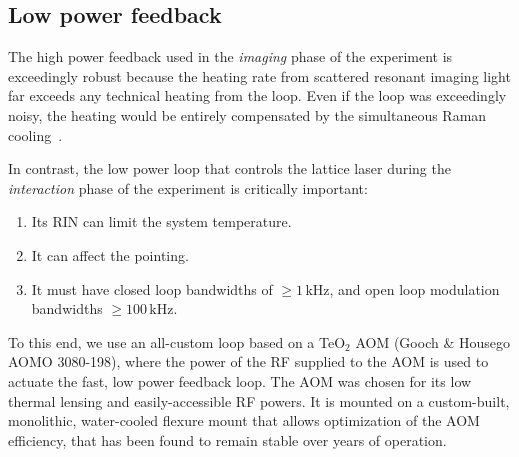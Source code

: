 \documentclass[twocolumn,aps,pra,showpacs,preprintnumbers,bibnotes]{revtex4-1}
\begin{document}
\subsection{Low power feedback}
The high power feedback used in the \textit{imaging} phase of the experiment is exceedingly robust because the heating rate from scattered resonant imaging light far exceeds any technical heating from the loop.
Even if the loop was exceedingly noisy, the heating would be entirely compensated by the simultaneous Raman cooling~\cite{Parsons2015}.

In contrast, the low power loop that controls the lattice laser during the \textit{interaction} phase of the experiment is critically important:
\begin{enumerate}
  \item Its RIN can limit the system temperature.
  \item It can affect the pointing.
  \item It must have closed loop bandwidths of $\geq1\mathrm{\,kHz}$, and open loop modulation bandwidths $\geq 100\mathrm{\,kHz}$.
\end{enumerate}
To this end, we use an all-custom loop based on a TeO$_2$ AOM (Gooch \& Housego AOMO 3080-198), where the power of the RF supplied to the AOM is used to actuate the fast, low power feedback loop.
The AOM was chosen for its low thermal lensing and easily-accessible RF powers. 
It is mounted on a custom-built, monolithic, water-cooled flexure mount that allows optimization of the AOM efficiency, that has been found to remain stable over years of operation.
\end{document}
